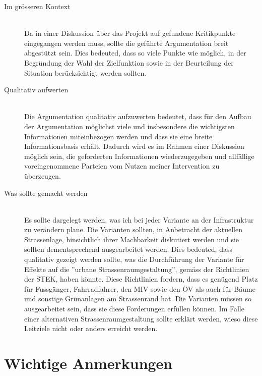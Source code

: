 \documentclass[
  paper=a4,                         %
  fontsize=11pt,                    %
  DIV=12,                           %
  BCOR=10mm,                        %
  twoside=true,                     %
  parskip=half,                     %
  headings=small,                   %
 ]{scrartcl}
\begin{document}
\begin{description}
\item[Im grösseren Kontext] \hfill \\
\vspace{2mm}
Da in einer Diskussion über das Projekt auf gefundene Kritikpunkte eingegangen werden muss, sollte die geführte Argumentation breit abgestützt sein. Dies bedeuted, dass so viele Punkte wie möglich, in der Begründung der Wahl der Zielfunktion sowie in der Beurteilung der Situation berücksichtigt werden sollten. 

\item[Qualitativ aufwerten] \hfill \\
\vspace{2mm}
Die Argumentation qualitativ aufzuwerten bedeutet, dass für den Aufbau der Argumentation möglichst viele und insbesondere die wichtigsten Informationen miteinbezogen werden und dass sie eine breite Informationsbasis erhält. Dadurch wird es im Rahmen einer Diskussion möglich sein, die geforderten Informationen wiederzugegeben und allfällige voreingenommene Parteien vom Nutzen meiner Intervention zu überzeugen. \\ 

\item[Was sollte gemacht werden] \hfill \\
\vspace{2mm}
Es sollte dargelegt werden, was ich bei jeder Variante an der Infrastruktur zu verändern plane. Die Varianten sollten, in Anbetracht der aktuellen Strassenlage, hinsichtlich ihrer Machbarkeit diskutiert werden und sie sollten dementsprechend ausgearbeitet werden. Dies bedeuted, dass qualitativ gezeigt werden sollte, was die Durchführung der Variante für Effekte auf die ''urbane Strassenraumgestaltung'', gemäss der Richtlinien der STEK, haben könnte. Diese Richtlinien fordern, dass es genügend Platz für Fussgänger, Fahrradfahrer, den MIV sowie den ÖV als auch für Bäume und sonstige Grünanlagen am Strassenrand hat. Die Varianten müssen so ausgearbeitet sein, dass sie diese Forderungen erfüllen können. Im Falle einer alternativen Strassenraumgestaltung sollte erklärt werden, wieso diese Leitziele nicht oder anders erreicht werden. 
\end{description}

\section{\large Wichtige Anmerkungen}
\end{document}
